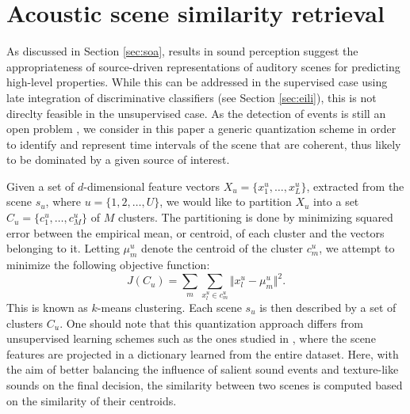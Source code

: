 \documentclass[journal]{IEEEtran}
\begin{document}
\section{Acoustic scene similarity retrieval}
\label{sec:object}



As discussed in Section \ref{sec:soa}, results in sound perception suggest the appropriateness of source-driven representations of auditory scenes for predicting high-level properties. While this can be addressed in the supervised case using late integration of discriminative classifiers (see Section \ref{sec:eili}), this is not direclty feasible in the unsupervised case. As the detection of events is still an open problem \cite{7100934}, we consider in this paper a generic quantization scheme in order to identify and represent time intervals of the scene that are coherent, thus likely to be dominated by a given source of interest.

Given a set of $d$-dimensional feature vectors $X_u = \{x_1^u, \ldots, x_L^u\}$, extracted from the scene $s_u$, where $u=\lbrace 1,2,\ldots,U\rbrace$, we would like to partition $X_u$ into a set $C_u = \{c^u_1, \ldots, c^u_M\}$ of $M$ clusters. The partitioning is done by minimizing squared error between the empirical mean, or centroid, of each cluster and the vectors belonging to it. Letting $\mu_m^u$ denote the centroid of the cluster $c_m^u$, we attempt to minimize the following objective function:
\begin{equation}
J(C_u)=\sum\limits_{m} \sum_{x^u_l\in c^u_m} \Vert x_l^u - \mu_m^u \Vert^2\mbox{.}
\end{equation}
This is known as $k$-means clustering.
Each scene $s_u$ is then described by a set of clusters $C_u$. One should note that this quantization approach differs from unsupervised learning schemes such as the ones studied in \cite{bisot2016acoustic}, where the scene features are projected in a dictionary learned from the entire dataset. Here, with the aim of better balancing the influence of salient sound events and texture-like sounds on the final decision, the similarity between two scenes is computed based on the similarity of their centroids.
\end{document}
